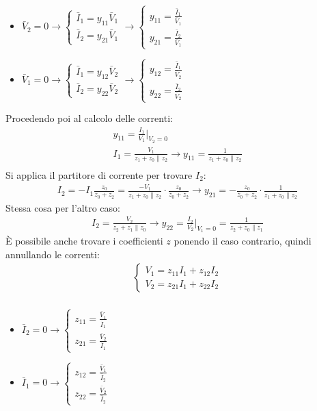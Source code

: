 \documentclass[../main.tex]{subfiles}
\begin{document}
\begin{exmp}
\begin{itemize}
			\item $\bar V_2=0 \rightarrow \begin{cases}
				\bar I_1=y_{11} \bar V_1 \\
				\bar I_2 = y_{21} \bar V_1
			\end{cases} \rightarrow \begin{cases}
				y_{11}=\frac{\bar I_1}{\bar V_1} \\
				y_{21}=\frac{\bar I_2}{\bar V_1}
			\end{cases}$
			\item $\bar V_1=0 \rightarrow \begin{cases}
				\bar I_1=y_{12} \bar V_2 \\
				\bar I_2 = y_{22} \bar V_2
			\end{cases} \rightarrow \begin{cases}
				y_{12}=\frac{\bar I_1}{\bar V_2} \\
				y_{22}=\frac{\bar I_2}{\bar V_2}
			\end{cases}$
		\end{itemize}
		Procedendo poi al calcolo delle correnti:
		\begin{gather}
			y_{11}=\frac{I_1}{V_1}|_{V_2=0} \\
			I_1 = \frac{V_1}{z_1+z_0 \parallel z_2} \rightarrow y_{11}=\frac{1}{z_1+z_0 \parallel z_2} \\
		\end{gather}
		Si applica il partitore di corrente per trovare $I_2$:
		\begin{gather}
			I_2=-I_1\frac{z_0}{z_0+z_2}=\frac{-V_1}{z_1+z_0 \parallel z_2} \cdot \frac{z_0}{z_0+z_2} \rightarrow y_{21}=-\frac{z_0}{z_0+z_2} \cdot \frac{1}{z_1+z_0 \parallel z_2}
		\end{gather}
		Stessa cosa per l'altro caso:
		\begin{gather}
			I_2 = \frac{V_2}{z_2+z_1 \parallel z_0} \rightarrow y_{22} = \frac{I_2}{V_2}|_{V_1=0} = \frac{1}{z_2+z_0 \parallel z_1} 
		\end{gather}
		È possibile anche trovare i coefficienti $z$ ponendo il caso contrario, quindi annullando le correnti:
		\begin{gather}
			\begin{cases}
				V_1=z_{11} I_1 + z_{12}I_2 \\
				V_2=z_{21} I_1 + z_{22}I_2
			\end{cases} \\
		\end{gather}
		\begin{itemize}
			\item $\bar I_2=0 \rightarrow \begin{cases}
				z_{11}=\frac{\bar V_1}{\bar I_1} \\
				z_{21}=\frac{\bar V_2}{\bar I_1}
			\end{cases}$
			\item $\bar I_1=0  \rightarrow \begin{cases}
				z_{12}=\frac{\bar V_1}{\bar I_2} \\
				z_{22}=\frac{\bar V_2}{\bar I_2}
			\end{cases}$
		\end{itemize}
	\end{exmp}
\end{document}
